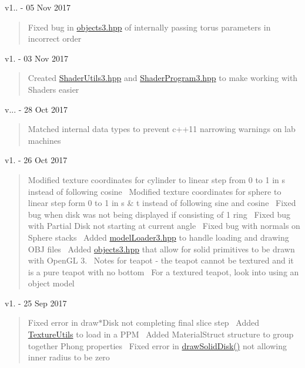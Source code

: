 v1.. -\/ 05 Nov 2017 \begin{quote}
Fixed bug in \hyperlink{objects3_8hpp}{objects3.\+hpp} of internally passing torus parameters in incorrect order \end{quote}


v1. -\/ 03 Nov 2017 \begin{quote}
Created \hyperlink{_shader_utils3_8hpp}{Shader\+Utils3.\+hpp} and \hyperlink{_shader_program3_8hpp}{Shader\+Program3.\+hpp} to make working with Shaders easier \end{quote}


v... -\/ 28 Oct 2017 \begin{quote}
Matched internal data types to prevent c++11 narrowing warnings on lab machines \end{quote}


v1. -\/ 26 Oct 2017 \begin{quote}
Modified texture coordinates for cylinder to linear step from 0 to 1 in s instead of following cosine~\newline
Modified texture coordinates for sphere to linear step form 0 to 1 in s \& t instead of following sine and cosine~\newline
Fixed bug when disk was not being displayed if consisting of 1 ring~\newline
Fixed bug with Partial Disk not starting at current angle~\newline
Fixed bug with normals on Sphere stacks~\newline
Added \hyperlink{model_loader3_8hpp}{model\+Loader3.\+hpp} to handle loading and drawing O\+BJ files~\newline
Added \hyperlink{objects3_8hpp}{objects3.\+hpp} that allow for solid primitives to be drawn with Open\+GL 3.~\newline
Notes for teapot -\/ the teapot cannot be textured and it is a pure teapot with no bottom~\newline
For a textured teapot, look into using an object model \end{quote}


v1. -\/ 25 Sep 2017 \begin{quote}
Fixed error in draw$\ast$\+Disk not completing final slice step~\newline
Added \hyperlink{namespace_texture_utils}{Texture\+Utils} to load in a P\+PM~\newline
Added Material\+Struct structure to group together Phong properties~\newline
Fixed error in \hyperlink{namespace_c_s_c_i441_a9bc98669fe2b67ecb45d7b18c61f74d9}{draw\+Solid\+Disk()} not allowing inner radius to be zero \end{quote}


